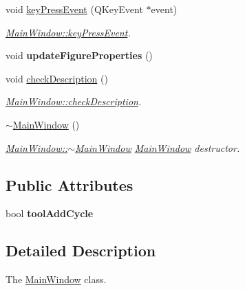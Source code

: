\begin{DoxyCompactItemize}
void \mbox{\hyperlink{class_main_window_a9c4f542263838b9ecd06eae839a42a34}{key\+Press\+Event}} (Q\+Key\+Event $\ast$event)
\begin{DoxyCompactList}\small\item\em \mbox{\hyperlink{class_main_window_a9c4f542263838b9ecd06eae839a42a34}{Main\+Window\+::key\+Press\+Event}}. \end{DoxyCompactList}\item 
\mbox{\label{class_main_window_af99d72b486f296b0cd86f2f9021a6343}} 
void {\bfseries update\+Figure\+Properties} ()
\item 
void \mbox{\hyperlink{class_main_window_a3e72a214988b3628c36ad4f3e41dc0af}{check\+Description}} ()
\begin{DoxyCompactList}\small\item\em \mbox{\hyperlink{class_main_window_a3e72a214988b3628c36ad4f3e41dc0af}{Main\+Window\+::check\+Description}}. \end{DoxyCompactList}\item 
\mbox{\label{class_main_window_ae98d00a93bc118200eeef9f9bba1dba7}} 
\mbox{\hyperlink{class_main_window_ae98d00a93bc118200eeef9f9bba1dba7}{$\sim$\+Main\+Window}} ()
\begin{DoxyCompactList}\small\item\em \mbox{\hyperlink{class_main_window_ae98d00a93bc118200eeef9f9bba1dba7}{Main\+Window\+::$\sim$\+Main\+Window}} \mbox{\hyperlink{class_main_window}{Main\+Window}} destructor. \end{DoxyCompactList}\end{DoxyCompactItemize}
\subsection*{Public Attributes}
\begin{DoxyCompactItemize}
\item 
\mbox{\label{class_main_window_ada1631bee647fb176facf5077da7f91c}} 
bool {\bfseries tool\+Add\+Cycle}
\end{DoxyCompactItemize}


\subsection{Detailed Description}
The \mbox{\hyperlink{class_main_window}{Main\+Window}} class. 

